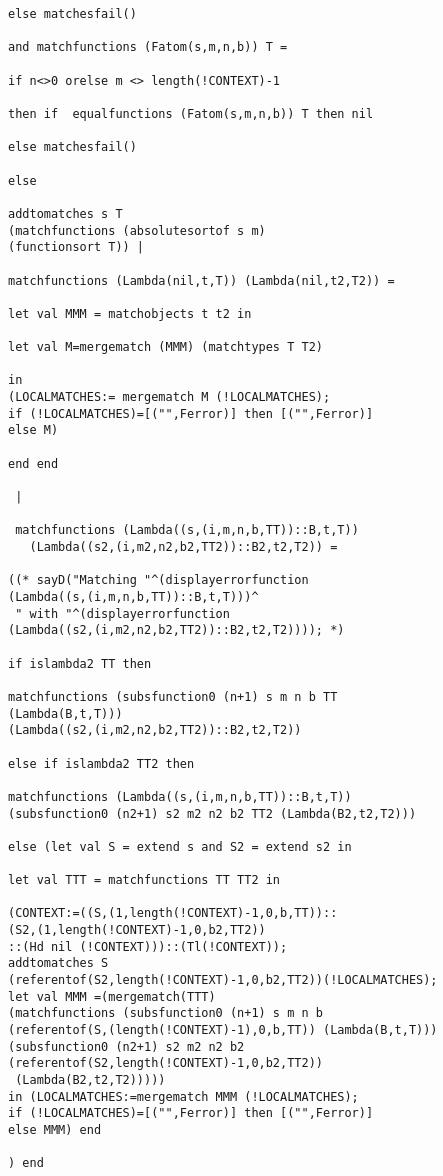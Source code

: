 \documentclass[12pt]{article}
\begin{document}
\begin{verbatim}
else matchesfail()

and matchfunctions (Fatom(s,m,n,b)) T =

if n<>0 orelse m <> length(!CONTEXT)-1

then if  equalfunctions (Fatom(s,m,n,b)) T then nil

else matchesfail()

else 

addtomatches s T 
(matchfunctions (absolutesortof s m) 
(functionsort T)) |

matchfunctions (Lambda(nil,t,T)) (Lambda(nil,t2,T2)) =

let val MMM = matchobjects t t2 in

let val M=mergematch (MMM) (matchtypes T T2)

in
(LOCALMATCHES:= mergematch M (!LOCALMATCHES);
if (!LOCALMATCHES)=[("",Ferror)] then [("",Ferror)]
else M)

end end

 |
 
 matchfunctions (Lambda((s,(i,m,n,b,TT))::B,t,T))
   (Lambda((s2,(i,m2,n2,b2,TT2))::B2,t2,T2)) =

((* sayD("Matching "^(displayerrorfunction 
(Lambda((s,(i,m,n,b,TT))::B,t,T)))^
 " with "^(displayerrorfunction 
(Lambda((s2,(i,m2,n2,b2,TT2))::B2,t2,T2)))); *)

if islambda2 TT then

matchfunctions (subsfunction0 (n+1) s m n b TT 
(Lambda(B,t,T)))
(Lambda((s2,(i,m2,n2,b2,TT2))::B2,t2,T2))

else if islambda2 TT2 then

matchfunctions (Lambda((s,(i,m,n,b,TT))::B,t,T)) 
(subsfunction0 (n2+1) s2 m2 n2 b2 TT2 (Lambda(B2,t2,T2)))

else (let val S = extend s and S2 = extend s2 in

let val TTT = matchfunctions TT TT2 in

(CONTEXT:=((S,(1,length(!CONTEXT)-1,0,b,TT))::
(S2,(1,length(!CONTEXT)-1,0,b2,TT2))
::(Hd nil (!CONTEXT)))::(Tl(!CONTEXT));
addtomatches S 
(referentof(S2,length(!CONTEXT)-1,0,b2,TT2))(!LOCALMATCHES);
let val MMM =(mergematch(TTT)
(matchfunctions (subsfunction0 (n+1) s m n b 
(referentof(S,(length(!CONTEXT)-1),0,b,TT)) (Lambda(B,t,T)))
(subsfunction0 (n2+1) s2 m2 n2 b2 
(referentof(S2,length(!CONTEXT)-1,0,b2,TT2))
 (Lambda(B2,t2,T2)))))
in (LOCALMATCHES:=mergematch MMM (!LOCALMATCHES);
if (!LOCALMATCHES)=[("",Ferror)] then [("",Ferror)]
else MMM) end 

) end


\end{verbatim}
\end{document}
